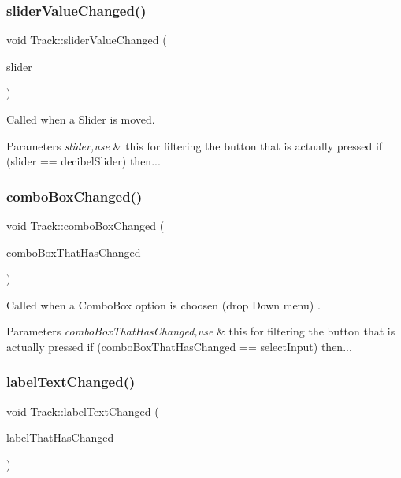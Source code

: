 \subsubsection{\texorpdfstring{sliderValueChanged()}{sliderValueChanged()}}
{\footnotesize\ttfamily void Track\+::slider\+Value\+Changed (\begin{DoxyParamCaption}\item[{Slider $\ast$}]{slider }\end{DoxyParamCaption})\hspace{0.3cm}{\ttfamily [override]}}

Called when a Slider is moved. 
\begin{DoxyParams}{Parameters}
{\em slider,use} & this for filtering the button that is actually pressed if (slider == decibel\+Slider) then... \\
\hline
\end{DoxyParams}
\mbox{\label{class_track_ac9870b46d656c0390cbec57731d96d9e}} 
\subsubsection{\texorpdfstring{comboBoxChanged()}{comboBoxChanged()}}
{\footnotesize\ttfamily void Track\+::combo\+Box\+Changed (\begin{DoxyParamCaption}\item[{Combo\+Box $\ast$}]{combo\+Box\+That\+Has\+Changed }\end{DoxyParamCaption})\hspace{0.3cm}{\ttfamily [override]}}

Called when a Combo\+Box option is choosen (drop Down menu) . 
\begin{DoxyParams}{Parameters}
{\em combo\+Box\+That\+Has\+Changed,use} & this for filtering the button that is actually pressed if (combo\+Box\+That\+Has\+Changed == select\+Input) then... \\
\hline
\end{DoxyParams}
\mbox{\label{class_track_a7dd5facb0d03d74f578b86b0280f33da}} 
\subsubsection{\texorpdfstring{labelTextChanged()}{labelTextChanged()}}
{\footnotesize\ttfamily void Track\+::label\+Text\+Changed (\begin{DoxyParamCaption}\item[{Label $\ast$}]{label\+That\+Has\+Changed }\end{DoxyParamCaption})\hspace{0.3cm}{\ttfamily [override]}}

